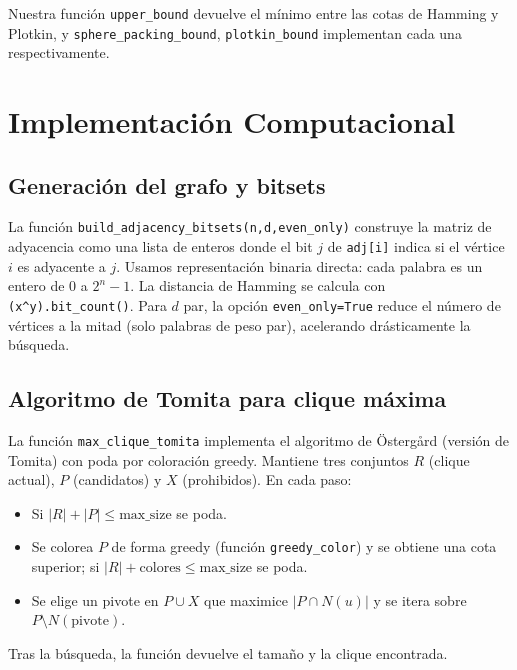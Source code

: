 \documentclass[12pt, spanish]{article}
\begin{document}
Nuestra función \texttt{upper\_bound} devuelve el mínimo entre las cotas de Hamming y Plotkin, y \texttt{sphere\_packing\_bound}, \texttt{plotkin\_bound} implementan cada una respectivamente.

\section{Implementación Computacional}
\subsection{Generación del grafo y bitsets}
La función \texttt{build\_adjacency\_bitsets(n,d,even\_only)} construye la matriz de adyacencia como una lista de enteros donde el bit $j$ de \texttt{adj[i]} indica si el vértice $i$ es adyacente a $j$. Usamos representación binaria directa: cada palabra es un entero de $0$ a $2^n-1$. La distancia de Hamming se calcula con \texttt{(x\^{}y).bit\_count()}. Para $d$ par, la opción \texttt{even\_only=True} reduce el número de vértices a la mitad (solo palabras de peso par), acelerando drásticamente la búsqueda.

\subsection{Algoritmo de Tomita para clique máxima}
La función \texttt{max\_clique\_tomita} implementa el algoritmo de Östergård\cite{ostergard2002} (versión de Tomita) con poda por coloración greedy. Mantiene tres conjuntos $R$ (clique actual), $P$ (candidatos) y $X$ (prohibidos). En cada paso:
\begin{itemize}
\item Si $|R|+|P|\le \text{max\_size}$ se poda.
\item Se colorea $P$ de forma greedy (función \texttt{greedy\_color}) y se obtiene una cota superior; si $|R|+\text{colores}\le\text{max\_size}$ se poda.
\item Se elige un pivote en $P\cup X$ que maximice $|P\cap N(u)|$ y se itera sobre $P\setminus N(\text{pivote})$.
\end{itemize}
Tras la búsqueda, la función devuelve el tamaño y la clique encontrada.
\end{document}
